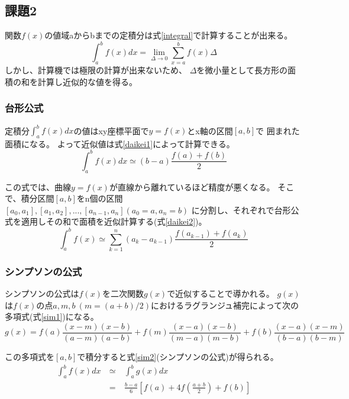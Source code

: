 \documentclass[dvipdfmx]{jsarticle}
\begin{document}
\subsection{課題2}

関数$f(x)$の値域aからbまでの定積分は式\ref{integral}で計算することが出来る。
\begin{equation}
  \int_a^b f(x) dx = \lim_{\Delta \to 0} \sum_{x=a}^{b} f(x) \Delta
  \label{integral}
\end{equation}
しかし、計算機では極限の計算が出来ないため、
$\Delta$を微小量として長方形の面積の和を計算し近似的な値を得る。

\subsubsection{台形公式}
定積分$\int_a^b f(x)dx$の値はxy座標平面で$y=f(x)$とx軸の区間$[a,b]$で
囲まれた面積になる。
よって近似値は式\ref{daikei1}によって計算できる。
\begin{equation}
  \int_a^b f(x)dx \simeq (b-a)\frac{f(a)+f(b)}{2}
  \label{daikei1}
\end{equation}

この式では、曲線$y=f(x)$が直線から離れているほど精度が悪くなる。
そこで、積分区間$[a,b]$をn個の区間$[a_0,a_1],[a_1,a_2],...,[a_{n-1},a_n] (a_0=a,a_n=b)$
に分割し、それぞれで台形公式を適用しその和で面積を近似計算する(式\ref{daikei2})。
\begin{equation}
  \int_a^b f(x) \simeq \sum_{k=1}^{n} (a_k-a_{k-1})\frac{f(a_{k-1})+f(a_k)}{2}
  \label{daikei2}
\end{equation}

\subsubsection{シンプソンの公式}
シンプソンの公式は$f(x)$を二次関数$g(x)$で近似することで導かれる。
$g(x)$は$f(x)$の点$a,m,b~(m=(a+b)/2)$におけるラグランジュ補完によって次の多項式(式\ref{sim1})になる。
\begin{equation}
  g(x) = f(a)\frac{(x-m)(x-b)}{(a-m)(a-b)}+f(m)\frac{(x-a)(x-b)}{(m-a)(m-b)}+f(b)\frac{(x-a)(x-m)}{(b-a)(b-m)}
  \label{sim1}
\end{equation}

この多項式を$[a,b]$で積分すると式\ref{sim2}(シンプソンの公式)が得られる。
\begin{eqnarray}
  \int_a^b f(x)dx ~&\simeq&~ \int_a^b g(x)dx \nonumber \\
  &=&~ \frac{b-a}{6} \left[f(a)+4f(\frac{a+b}{2})+f(b)\right]
  \label{sim2}
\end{eqnarray}
\end{document}
